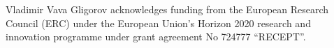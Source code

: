 Vladimir Vava Gligorov acknowledges funding from the European Research Council (ERC) under the European Union's Horizon 2020 research and innovation programme under grant agreement No 724777 ``RECEPT''.
